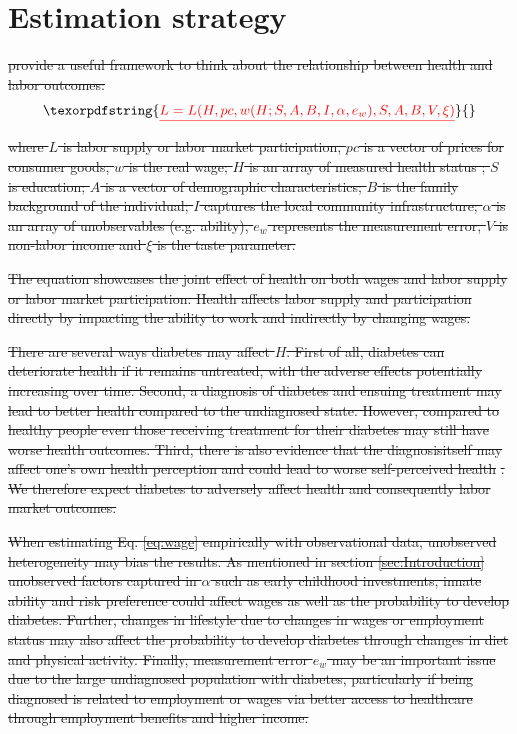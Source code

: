 \documentclass[12pt,english]{article}
\providecommand{\DIFdeltex}[1]{{\protect\color{red}\sout{#1}}}                      %
\providecommand{\DIFdelbegin}{} %
\providecommand{\DIFdel}[1]{\texorpdfstring{\DIFdeltex{#1}}{}} %
\begin{document}
\section{\label{sec:Estimation Strategy}Estimation strategy}


\DIFdelbegin \DIFdel{\textcite{Strauss1998} provide a useful framework to think about the relationship between health and labor outcomes:
}\begin{displaymath}\DIFdel{
L=L(H, pc, w(H;S,A,B,I,\alpha,e_{w}), S, A, B, V, \xi) \label{eq:wage}
}\end{displaymath}
\DIFdel{where $L$ is labor supply or labor market participation, $pc $ is a vector of prices for consumer goods, $w$ is the real wage; $H$ is an array of measured health status ; $S$ is education; $A$ is a vector of demographic characteristics; $B$ is the family background of the individual; $I$ captures the local community infrastructure; $\alpha$ is an array of unobservables (e.g. ability), $e_w$ represents the measurement error, $V$ is non-labor income and $\xi$ is the taste parameter. 
}%

\DIFdel{The equation showcases the joint effect of health on both wages and labor supply or labor market participation. Health affects labor supply and participation directly by impacting the ability to work and indirectly by changing wages.
}%

\DIFdel{There are several ways diabetes may affect $H$. First of all, diabetes can deteriorate health if it remains untreated, with the adverse effects potentially increasing over time. Second, a diagnosis of diabetes and ensuing treatment may lead to better health compared to the undiagnosed state. However, compared to healthy people even those receiving treatment for their diabetes may still have worse health outcomes. Third, there is also evidence that the diagnosisitself may affect one's own health perception and could lead to worse self-perceived health }%
\DIFdel{. We therefore expect diabetes to adversely affect health and consequently labor market outcomes.
}%

\DIFdel{When estimating Eq. \ref{eq:wage} empirically with observational data, unobserved heterogeneity may bias the results. As mentioned in section  \ref{sec:Introduction} unobserved factors captured in $\alpha$ such as early childhood investments, innate ability and risk preference could affect wages as well as the probability to develop diabetes. Further, changes in lifestyle due to changes in wages or employment status may also affect the probability to develop diabetes through changes in diet and physical activity. Finally, measurement error $e_w$ may be an important issue due to the large undiagnosed population with diabetes, particularly if being diagnosed is related to employment or wages via better access to healthcare through employment benefits and higher income.
}%
\end{document}
